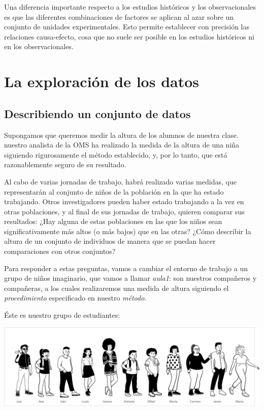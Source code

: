 \documentclass[
  letterpaper,
  DIV=11,
  numbers=noendperiod,
  oneside]{scrreprt}
\begin{document}
Una diferencia importante respecto a los estudios históricos y los
observacionales es que las diferentes combinaciones de factores se
aplican al azar sobre un conjunto de unidades experimentales. Esto
permite establecer con precisión las relaciones causa-efecto, cosa que
no suele ser posible en los estudios históricos ni en los
observacionales.


\hypertarget{la-exploraciuxf3n-de-los-datos}{%
\chapter{La exploración de los
datos}\label{la-exploraciuxf3n-de-los-datos}}

\hypertarget{describiendo-un-conjunto-de-datos}{%
\section{Describiendo un conjunto de
datos}\label{describiendo-un-conjunto-de-datos}}

Supongamos que queremos medir la altura de los alumnos de nuestra clase.
nuestro analista de la OMS ha realizado la medida de la altura de una
niña siguiendo rigurosamente el método establecido, y, por lo tanto, que
está razonablemente seguro de su resultado.

Al cabo de varias jornadas de trabajo, habrá realizado varias medidas,
que representarán al conjunto de niños de la población en la que ha
estado trabajando. Otros investigadores pueden haber estado trabajando a
la vez en otras poblaciones, y al final de sus jornadas de trabajo,
quieren comparar sus resultados: ¿Hay alguna de estas poblaciones en las
que los niños sean significativamente más altos (o más bajos) que en las
otras? ¿Cómo describir la altura de un conjunto de individuos de manera
que se puedan hacer comparaciones con otros conjuntos?

Para responder a estas preguntas, vamos a cambiar el entorno de trabajo
a un grupo de niños imaginario, que vamos a llamar \emph{aula1}: son
nuestros compañeros y compañeras, a los cuales realizaremos una medida
de altura siguiendo el \emph{procedimiento} especificado en nuestro
\emph{método}.

Éste es nuestro grupo de estudiantes:

\includegraphics{01-imagenes/grupo1.jpg}
\end{document}
